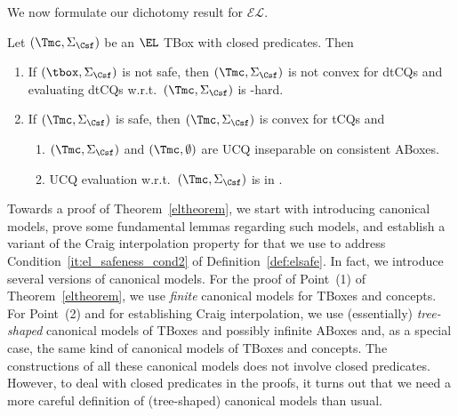 \documentclass{lmcs}
\theoremstyle{definition}
\begin{document}
We now formulate our dichotomy result for $\mathcal{EL}$.
\begin{thm}\label{eltheorem}
  Let $(\Tmc,\Sigma_{\Csf})$ be an $\EL$ TBox with closed predicates. Then
  \begin{enumerate}
  \item If $(\tbox,\Sigma_{\Csf})$ is not safe, then $(\Tmc,\Sigma_{\Csf})$ is not
    convex for dtCQs and evaluating dtCQs w.r.t.~$(\Tmc,\Sigma_{\Csf})$ is
    \conp-hard.
  \item If $(\Tmc,\Sigma_{\Csf})$ is safe, then $(\Tmc,\Sigma_{\Csf})$ is convex for tCQs and
    \begin{enumerate}
    \item $(\Tmc,\Sigma_{\Csf})$ and $(\Tmc,\emptyset)$ are UCQ inseparable on consistent ABoxes.
    \item UCQ evaluation w.r.t.\ $(\Tmc,\Sigma_{\Csf})$ is in \ptime.
    \end{enumerate}
  \end{enumerate}
\end{thm}
Towards a proof of Theorem~\ref{eltheorem}, we start with introducing
canonical models, prove some fundamental lemmas regarding such models,
and establish a variant of the Craig interpolation property for \EL
that we use to address Condition~\ref{it:el_safeness_cond2} of
Definition~\ref{def:elsafe}. In fact, we introduce several versions of
canonical models. For the proof of Point~(1) of
Theorem~\ref{eltheorem}, we use \emph{finite} canonical models for \EL
TBoxes and \EL concepts. For Point~(2) and for establishing Craig
interpolation, we use (essentially) \emph{tree-shaped} canonical
models of \EL TBoxes and possibly infinite ABoxes and,
as a special case, the same kind of canonical models of \EL TBoxes and
\EL concepts. The constructions of all these canonical models does not
involve closed predicates. However, to deal with closed predicates in
the proofs, it turns out that we need a more careful definition of
(tree-shaped) canonical models than usual.
\end{document}
